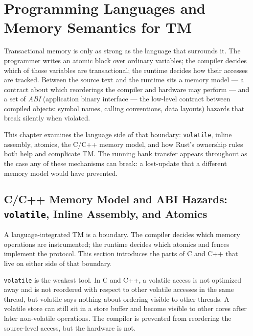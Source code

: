 \chapter{Programming Languages and Memory Semantics for TM}

Transactional memory is only as strong as the language that surrounds it.
The programmer writes an atomic block over ordinary variables; the compiler
decides which of those variables are transactional; the runtime decides how
their accesses are tracked. Between the source text and the runtime sits a
memory model --- a contract about which reorderings the compiler and hardware
may perform --- and a set of \emph{ABI} (application binary interface --- the
low-level contract between compiled objects: symbol names, calling
conventions, data layouts) hazards that break silently when violated.

This chapter examines the language side of that boundary: \texttt{volatile},
inline assembly, atomics, the C/C++ memory model, and how Rust's ownership
rules both help and complicate TM. The running bank transfer appears
throughout as the case any of these mechanisms can break: a lost-update that a
different memory model would have prevented.

\section[C/C++ Memory Model and ABI Hazards]{C/C++ Memory Model and ABI Hazards: \texttt{volatile}, Inline Assembly, and Atomics}

A language-integrated TM is a boundary. The compiler decides which memory
operations are instrumented; the runtime decides which atomics and fences
implement the protocol. This section introduces the parts of C and C++ that
live on either side of that boundary.

\texttt{volatile} is the weakest tool. In C and C++, a volatile access is not
optimized away and is not reordered with respect to other volatile accesses in
the same thread, but volatile says nothing about ordering visible to other
threads. A volatile store can still sit in a store buffer and become visible to
other cores after later non-volatile operations. The compiler is prevented
from reordering the source-level access, but the hardware is not.

